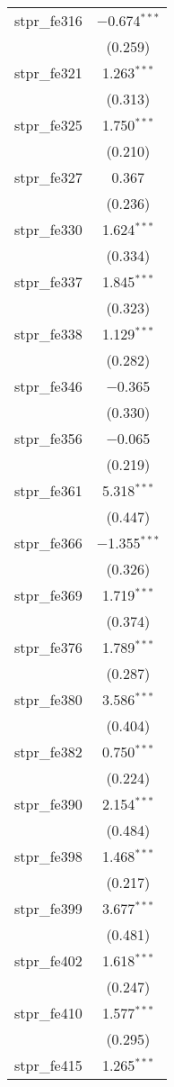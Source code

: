 \begin{table}[!htbp]
\begin{tabular}{@{\extracolsep{5pt}}lc}
  stpr\_fe316 & $-$0.674$^{***}$ \\ 
  & (0.259) \\ 
  stpr\_fe321 & 1.263$^{***}$ \\ 
  & (0.313) \\ 
  stpr\_fe325 & 1.750$^{***}$ \\ 
  & (0.210) \\ 
  stpr\_fe327 & 0.367 \\ 
  & (0.236) \\ 
  stpr\_fe330 & 1.624$^{***}$ \\ 
  & (0.334) \\ 
  stpr\_fe337 & 1.845$^{***}$ \\ 
  & (0.323) \\ 
  stpr\_fe338 & 1.129$^{***}$ \\ 
  & (0.282) \\ 
  stpr\_fe346 & $-$0.365 \\ 
  & (0.330) \\ 
  stpr\_fe356 & $-$0.065 \\ 
  & (0.219) \\ 
  stpr\_fe361 & 5.318$^{***}$ \\ 
  & (0.447) \\ 
  stpr\_fe366 & $-$1.355$^{***}$ \\ 
  & (0.326) \\ 
  stpr\_fe369 & 1.719$^{***}$ \\ 
  & (0.374) \\ 
  stpr\_fe376 & 1.789$^{***}$ \\ 
  & (0.287) \\ 
  stpr\_fe380 & 3.586$^{***}$ \\ 
  & (0.404) \\ 
  stpr\_fe382 & 0.750$^{***}$ \\ 
  & (0.224) \\ 
  stpr\_fe390 & 2.154$^{***}$ \\ 
  & (0.484) \\ 
  stpr\_fe398 & 1.468$^{***}$ \\ 
  & (0.217) \\ 
  stpr\_fe399 & 3.677$^{***}$ \\ 
  & (0.481) \\ 
  stpr\_fe402 & 1.618$^{***}$ \\ 
  & (0.247) \\ 
  stpr\_fe410 & 1.577$^{***}$ \\ 
  & (0.295) \\ 
  stpr\_fe415 & 1.265$^{***}$ \\ 

\end{tabular}
\end{table}
